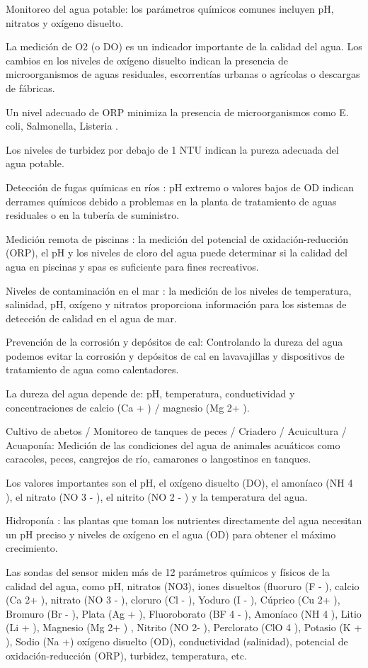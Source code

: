 Monitoreo del agua potable: los parámetros químicos comunes incluyen pH, nitratos y oxígeno disuelto. 

La medición de O2 (o DO) es un indicador importante de la calidad del agua. 
Los cambios en los niveles de oxígeno disuelto indican la presencia de microorganismos de aguas residuales, escorrentías urbanas o agrícolas o descargas de fábricas. 

Un nivel adecuado de ORP minimiza la presencia de microorganismos como  E. coli, Salmonella, Listeria . 

Los niveles de turbidez por debajo de 1 NTU indican la pureza adecuada del agua potable.

Detección de fugas químicas en ríos : pH extremo o valores bajos de OD indican derrames químicos debido a problemas en la planta de tratamiento de aguas residuales o en la tubería de suministro.

Medición remota de piscinas : la medición del potencial de oxidación-reducción (ORP), el pH y los niveles de cloro del agua puede determinar si la calidad del agua en piscinas y spas es suficiente para fines recreativos.

Niveles de contaminación en el mar : la medición de los niveles de temperatura, salinidad, pH, oxígeno y nitratos proporciona información para los sistemas de detección de calidad en el agua de mar.

Prevención de la corrosión y depósitos de cal:  Controlando la dureza del agua podemos evitar la corrosión y depósitos de cal en lavavajillas y dispositivos de tratamiento de agua como calentadores. 

La dureza del agua depende de: pH, temperatura, conductividad y concentraciones de calcio (Ca + ) / magnesio (Mg 2+ ).

Cultivo de abetos / Monitoreo de tanques de peces / Criadero / Acuicultura / Acuaponía: Medición de las condiciones del agua de animales acuáticos como caracoles, peces, cangrejos de río, camarones o langostinos en tanques. 

Los valores importantes son el pH, el oxígeno disuelto (DO), el amoníaco (NH 4 ), el nitrato (NO 3 - ), el nitrito (NO 2 - ) y la temperatura del agua.

Hidroponía : las plantas que toman los nutrientes directamente del agua necesitan un pH preciso y niveles de oxígeno en el agua (OD) para obtener el máximo crecimiento.

Las sondas del sensor miden más de 12 parámetros químicos y físicos de la calidad del agua, como pH, nitratos (NO3), iones disueltos (fluoruro (F - ), calcio (Ca 2+ ), nitrato (NO 3 - ), cloruro (Cl - ), Yoduro (I - ), Cúprico (Cu 2+ ), Bromuro (Br - ), Plata (Ag + ), Fluoroborato (BF 4 - ), Amoníaco (NH 4 ), Litio (Li + ), Magnesio (Mg 2+ ) , Nitrito (NO 2- ), Perclorato (ClO 4 ), Potasio (K + ), Sodio (Na +) oxígeno disuelto (OD), conductividad (salinidad), potencial de oxidación-reducción (ORP), turbidez, temperatura, etc.

